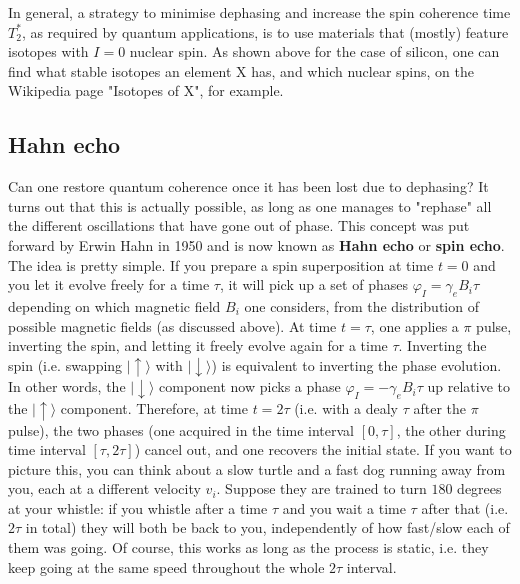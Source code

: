 \documentclass[a4paper,11pt]{article}
\newcommand{\ket}[1]{| #1 \rangle}
\begin{document}
In general, a strategy to minimise dephasing and increase the spin coherence time $T_2^*$, as required by quantum applications, is to use materials that (mostly) feature isotopes with $I=0$ nuclear spin. As shown above for the case of silicon, one can find what stable isotopes an element X has, and which nuclear spins, on the Wikipedia page "Isotopes of X", for example.
 
\subsection {Hahn echo}
Can one restore quantum coherence once it has been lost due to dephasing?
\newline It turns out that this is actually possible, as long as one manages to "rephase" all the different oscillations that have gone out of phase. This concept was put forward by Erwin Hahn in 1950 and is now known as {\bf Hahn echo} or {\bf spin echo}.
\newline The idea is pretty simple. If you prepare a spin superposition at time $t=0$ and you let it evolve freely for a time $\tau$, it will pick up a set of phases $\varphi_I = \gamma_e B_i \tau$ depending on which magnetic field $B_i$ one considers, from the distribution of possible magnetic fields (as discussed above). At time $t = \tau$, one applies a $\pi$ pulse, inverting the spin, and letting it freely evolve again for a time $\tau$. Inverting the spin (i.e. swapping $\ket{\uparrow}$ with $\ket{\downarrow}$) is equivalent to inverting the phase evolution. In other words, the $\ket{\downarrow}$ component now picks a phase $\varphi_I = -\gamma_e B_i \tau$ up relative to the $\ket{\uparrow}$ component.
Therefore, at time $t=2\tau$ (i.e. with a dealy $\tau$ after the $\pi$ pulse), the two phases (one acquired in the time interval $[0, \tau]$, the other during time interval $[\tau, 2\tau]$) cancel out, and one recovers the initial state.
\newline If you want to picture this, you can think about a slow turtle and a fast dog running away from you, each at a different velocity $v_i$. Suppose they are trained to turn $180$ degrees at your whistle: if you whistle after a time $\tau$ and you wait a time $\tau$ after that (i.e. $2\tau$ in total) they will both be back to you, independently of how fast/slow each of them was going. Of course, this works as long as the process is static, i.e. they keep going at the same speed throughout the whole $2\tau$ interval.
\end{document}
